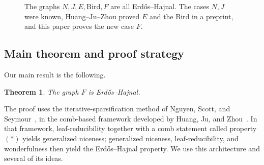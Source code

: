 \documentclass[11pt]{article}
\numberwithin{equation}{section}
\theoremstyle{plain}
\newtheorem{theorem}{Theorem}[section]
\theoremstyle{definition}
\begin{document}
\begin{figure}[!t]
\caption{The graphs $N,J,E,\mathrm{Bird},F$ are all
Erd\H{o}s--Hajnal.  The cases $N,J$ were known, Huang--Ju--Zhou proved
$E$ and the Bird in a preprint, and this paper proves the new
case $F$.}
\label{fig:six-vertex-representatives}
\end{figure}%

\subsection{Main theorem and proof strategy}

Our main result is the following.

\begin{theorem}
\label{thm:main}
The graph $F$ is Erd\H{o}s--Hajnal.
\end{theorem}

The proof uses the iterative-sparsification method of Nguyen, Scott, and
Seymour~\cite{NguyenScottSeymourDensityIV}, in the comb-based framework
developed by Huang, Ju, and Zhou~\cite{HuangJuZhou2026}.  In that
framework, leaf-reducibility together with a comb statement called
property $(*)$ yields generalized niceness; generalized niceness,
leaf-reducibility, and wonderfulness then yield the Erd\H{o}s--Hajnal
property.  We use this architecture and several of its ideas.
\end{document}

